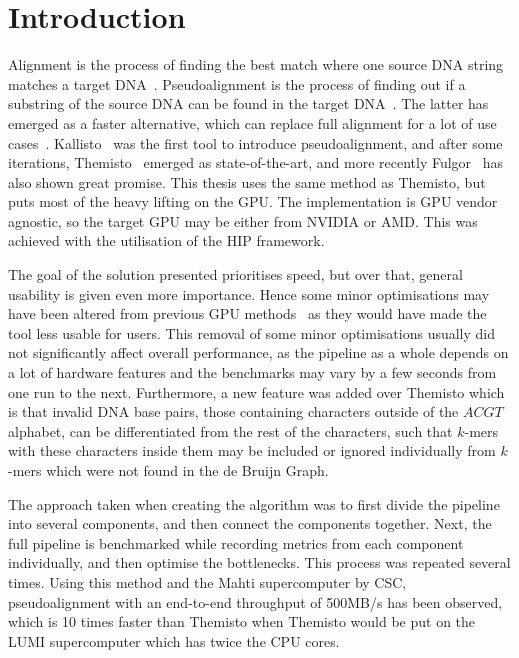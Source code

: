 \chapter{Introduction}

Alignment is the process of finding the best match where one source DNA string matches a target DNA~\cite{Alignment}.
Pseudoalignment is the process of finding out if a substring of the source DNA can be found in the target DNA~\cite{Kallisto}.
The latter has emerged as a faster alternative, which can replace full alignment for a lot of use cases~\cite{Kallisto}.
Kallisto~\cite{Kallisto} was the first tool to introduce pseudoalignment, and after some iterations, Themisto~\cite{Themisto} emerged as state-of-the-art, and more recently Fulgor~\cite{Fulgor} has also shown great promise.
This thesis uses the same method as Themisto, but puts most of the heavy lifting on the GPU.
The implementation is GPU vendor agnostic, so the target GPU may be either from NVIDIA or AMD.
This was achieved with the utilisation of the HIP framework.

The goal of the solution presented prioritises speed, but over that, general usability is given even more importance.
Hence some minor optimisations may have been altered from previous GPU methods~\cite{Harri} as they would have made the tool less usable for users.
This removal of some minor optimisations usually did not significantly affect overall performance, as the pipeline as a whole depends on a lot of hardware features and the benchmarks may vary by a few seconds from one run to the next.
Furthermore, a new feature was added over Themisto which is that invalid DNA base pairs, those containing characters outside of the $ACGT$ alphabet, can be differentiated from the rest of the characters, such that $k$-mers with these characters inside them may be included or ignored individually from $k$-mers which were not found in the de Bruijn Graph.

The approach taken when creating the algorithm was to first divide the pipeline into several components, and then connect the components together.
Next, the full pipeline is benchmarked while recording metrics from each component individually, and then optimise the bottlenecks.
This process was repeated several times.
Using this method and the Mahti supercomputer by CSC, pseudoalignment with an end-to-end throughput of 500MB/s has been observed, which is 10 times faster than Themisto when Themisto would be put on the LUMI supercomputer which has twice the CPU cores.

